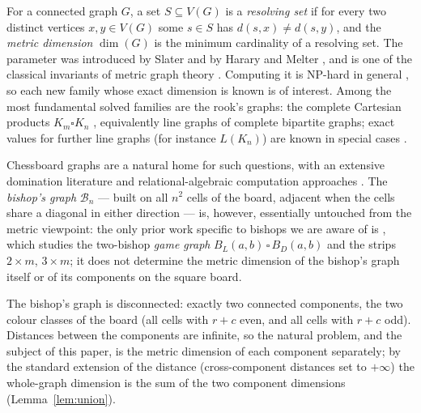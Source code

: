\documentclass[12pt]{article}
\theoremstyle{definition}
\newcommand{\BB}{\mathcal{B}}
\begin{document}
For a connected graph $G$, a set $S\subseteq V(G)$ is a \emph{resolving set} if for every two distinct vertices $x,y\in V(G)$ some $s\in S$ has $d(s,x)\neq d(s,y)$, and the \emph{metric dimension} $\dim(G)$ is the minimum cardinality of a resolving set. The parameter was introduced by Slater \cite{slater1975} and by Harary and Melter \cite{hararymelter1976}, and is one of the classical invariants of metric graph theory \cite{chartrand2000,baileycameron2011}. Computing it is NP-hard in general \cite{khuller1996,chartrand2000}, so each new family whose exact dimension is known is of interest. Among the most fundamental solved families are the rook's graphs: the complete Cartesian products $K_m\square K_n$ \cite{caceres2007}, equivalently line graphs of complete bipartite graphs; exact values for further line graphs (for instance $L(K_n)$) are known in special cases \cite{baileycameron2011,fengxuwang2013}.

Chessboard graphs are a natural home for such questions, with an extensive domination literature \cite{cockayne1986,cockayne1990,hedetniemi2020} and relational-algebraic computation approaches \cite{berghammer2012}. The \emph{bishop's graph} $\BB_n$ --- built on all $n^2$ cells of the board, adjacent when the cells share a diagonal in either direction --- is, however, essentially untouched from the metric viewpoint: the only prior work specific to bishops we are aware of is \cite{tennenhouse2019}, which studies the two-bishop \emph{game graph} $B_L(a,b)\,\square\,B_D(a,b)$ and the strips $2\times m$, $3\times m$; it does not determine the metric dimension of the bishop's graph itself or of its components on the square board.

The bishop's graph is disconnected: exactly two connected components, the two colour classes of the board (all cells with $r+c$ even, and all cells with $r+c$ odd). Distances between the components are infinite, so the natural problem, and the subject of this paper, is the metric dimension of each component separately; by the standard extension of the distance (cross-component distances set to $+\infty$) the whole-graph dimension is the sum of the two component dimensions (Lemma~\ref{lem:union}).
\end{document}
